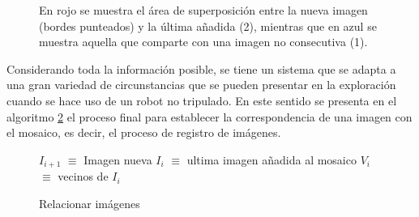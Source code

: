 \begin{figure}[hb]
	\centering     %
	\hspace{5mm}%
	\hspace{5mm}%
	
	\caption[Superposición de imágenes vecinas, cambio de sentido]{En rojo se muestra el área de superposición entre la nueva imagen (bordes punteados) y la última añadida (2), mientras que en azul se muestra aquella que comparte con una imagen no consecutiva (1).}
	
	\label{imagen:cambio-sentido}
\end{figure}

Considerando toda la información posible, se tiene un sistema que se adapta a una gran variedad de circunstancias que se pueden presentar en la exploración cuando se hace uso de un robot no tripulado. En este sentido se presenta en el algoritmo \ref{registro-completo} el proceso final para establecer la correspondencia de una imagen con el mosaico, es decir, el proceso de registro de imágenes.

\begin{figure}[h]
	\centering
	\begin{minipage}{.8\linewidth}
		\begin{algorithm}[H] %
			\caption{Relacionar imágenes}
			\label{registro-completo}
			\SetAlgoLined
			$I_{i+1}$ $\equiv$ Imagen nueva\;
			$I_{i}$ $\equiv$ ultima imagen añadida al mosaico\;
			$V_{i}$ $\equiv$ vecinos de $I_{i}$\;
		\end{algorithm}
	\end{minipage}
\end{figure}


